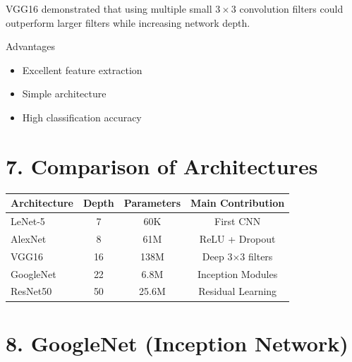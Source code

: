 \documentclass[11pt]{article}
\begin{document}
VGG16 demonstrated that using multiple small $3\times3$ convolution
filters could outperform larger filters while increasing network depth.


Advantages

\begin{itemize}

\item Excellent feature extraction

\item Simple architecture

\item High classification accuracy

\end{itemize}


\section*{7. Comparison of Architectures}

\begin{center}

\begin{tabular}{|l|c|c|c|}

\hline

Architecture &
Depth &
Parameters &
Main Contribution\\

\hline

LeNet-5 &
7 &
60K &
First CNN\\

AlexNet &
8 &
61M &
ReLU + Dropout\\

VGG16 &
16 &
138M &
Deep 3$\times3$ filters\\

GoogleNet &
22 &
6.8M &
Inception Modules\\

ResNet50 &
50 &
25.6M &
Residual Learning\\

\hline

\end{tabular}

\end{center}

\section*{8. GoogleNet (Inception Network)}
\end{document}

